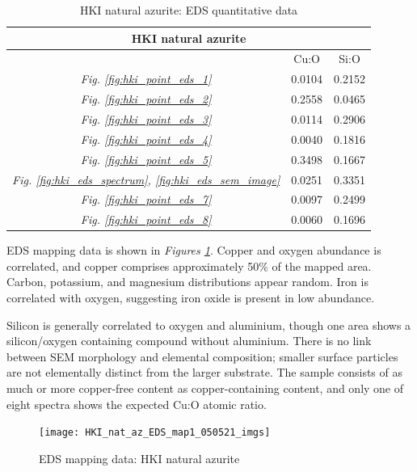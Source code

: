 \begin{table}[H]
\caption{HKI natural azurite: EDS quantitative data}
\centering
\label{table:hki_ratios}
\begin{tabular}{c c c}
\toprule
\multicolumn{3}{c}{HKI natural azurite} \\
\midrule
~ & Cu:O & Si:O \\
\midrule
\textit{Fig. \ref{fig:hki_point_eds_1}} & 0.0104 & 0.2152 \\
\textit{Fig. \ref{fig:hki_point_eds_2}} & 0.2558 & 0.0465 \\
\textit{Fig. \ref{fig:hki_point_eds_3}} & 0.0114 & 0.2906 \\
\textit{Fig. \ref{fig:hki_point_eds_4}} & 0.0040 & 0.1816 \\
\textit{Fig. \ref{fig:hki_point_eds_5}} & 0.3498 & 0.1667 \\
\textit{Fig. \ref{fig:hki_eds_spectrum}, \ref{fig:hki_eds_sem_image}} & 0.0251 & 0.3351  \\
\textit{Fig. \ref{fig:hki_point_eds_7}} & 0.0097 & 0.2499 \\
\textit{Fig. \ref{fig:hki_point_eds_8}} & 0.0060 & 0.1696 \\
\bottomrule
\end{tabular}
\end{table}

EDS mapping data is shown in \textit{Figures \ref{fig:hki_map1}}. Copper and oxygen abundance is correlated, and copper comprises approximately 50\% of the mapped area. Carbon, potassium, and magnesium distributions appear random. Iron is correlated with oxygen, suggesting iron oxide is present in low abundance. 

Silicon is generally correlated to oxygen and aluminium, though one area shows a silicon/oxygen containing compound without aluminium. There is no link between SEM morphology and elemental composition; smaller surface particles are not elementally distinct from the larger substrate. The sample consists of as much or more copper-free content as copper-containing content, and only one of eight spectra shows the expected Cu:O atomic ratio. 

\begin{figure}[H]
\centering
  \texttt{[image: HKI\_nat\_az\_EDS\_map1\_050521\_imgs]}
\caption[EDS mapping data: HKI natural azurite]{EDS mapping data: HKI natural azurite}
\label{fig:hki_map1}
\end{figure}



